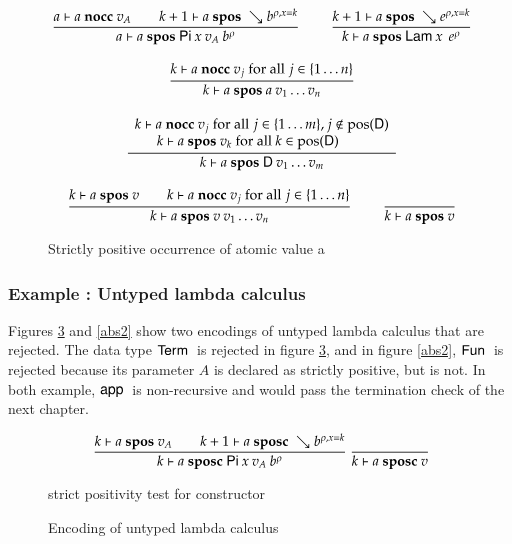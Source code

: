 \begin{figure}[htp]
\begin{gather*}
\ \dfrac{ a\vdash a\mbox{ \textbf{nocc} }v_A \qquad k+1\vdash a\mbox{ \textbf{spos} }\searrow b^{\rho,x=k}}{a\vdash a\mbox{ \textbf{spos} }\mathsf{Pi} \: x \: v_A \: b^{\rho}  }
\qquad
\ \dfrac{k+1\vdash a\mbox{ \textbf{spos} }\searrow e^{\rho,x=k}}{k\vdash a\mbox{ \textbf{spos} }\mathsf{Lam} \: x \: \: e^{\rho}  }
\\[2ex]
\ \dfrac{k\vdash a\mbox{ \textbf{nocc} }v_j \mbox{ for all } j \in \{1 \ldots n \}}{k\vdash a\mbox{ \textbf{spos} }a \: v_1 \ldots v_n}
\\[2ex]
\ \dfrac{\begin{array}[b]{c}k\vdash a\mbox{ \textbf{nocc} }v_j \mbox{ for all } j \in \{ 1 \ldots m\} , j \notin \mbox{pos}(\mathsf{D})\\k\vdash a\mbox{ \textbf{spos} }v_k \mbox{ for all } k \in \mbox{pos}(\mathsf{D}) \qquad\end{array}}{k\vdash a\mbox{ \textbf{spos} }\mathsf{D} \: v_1 \ldots v_m}
\\[2ex]
\ \dfrac{k\vdash a\mbox{ \textbf{spos} }v \qquad k\vdash a\mbox{ \textbf{nocc} }v_j \mbox{ for all } j \in \{1 \ldots n \}}{k\vdash a\mbox{ \textbf{spos} }v \: v_1 \ldots v_n}
\qquad
\ \dfrac{}{k\vdash a\mbox{ \textbf{spos} }v}
\end{gather*}
\caption{Strictly positive occurrence of atomic value a}
\label{fspos}
\end{figure}


\subsubsection{Example : Untyped lambda calculus}
Figures \ref{abs1} and \ref{abs2} show two encodings of untyped lambda calculus that are rejected. 
The data type $\mathsf{Term}\:$ is rejected in figure \ref{abs1}, and in figure \ref{abs2}, $\mathsf{Fun}\:$ is rejected because its parameter $A$ is declared as strictly positive, but is not.
In both example, $\mathsf{app}\:$ is non-recursive and would pass the termination check of the next chapter.


\begin{figure}[htp]
\begin{gather*}
\ \dfrac{ k\vdash a\mbox{ \textbf{spos} }v_A \qquad k+1\vdash a\mbox{ \textbf{sposc} }\searrow b^{\rho,x=k}}{k\vdash a\mbox{ \textbf{sposc} }\mathsf{Pi} \: x \: v_A \: b^{\rho}  }
\ \dfrac{}{k\vdash a\mbox{ \textbf{sposc} }v}
\end{gather*}
\caption{strict positivity test for constructor}
\label{sposcf}
\end{figure}

\begin{figure}[htp]
\caption{Encoding of untyped lambda calculus}
\label{abs1}
\end{figure}

